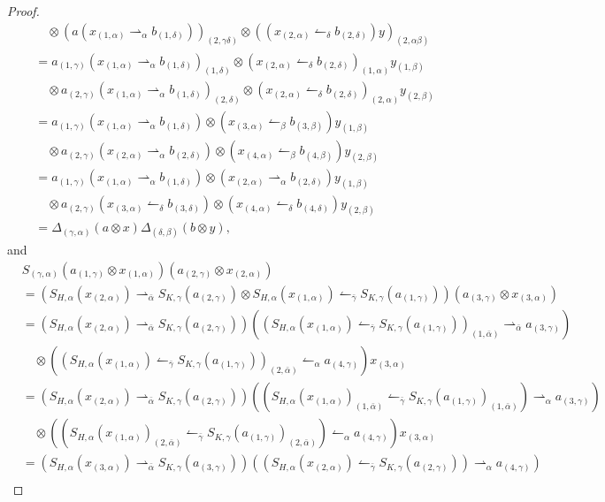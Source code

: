 \documentclass[11pt]{article}
\def\a{\alpha}
\def\b{\beta}
\def\d{\delta}
\def\g{\gamma}
\def\o{\otimes}
\begin{document}
\begin{proof}
\begin{align*}
&\quad \o(a(x_{(1,\a)}\rightharpoonup_\a b_{(1,\d)}))_{(2,\g\d)}\o((x_{(2,\a)}\leftharpoonup_\d b_{(2,\d)})y)_{(2,\a\b)}\\
&=a_{(1,\g)}(x_{(1,\a)}\rightharpoonup_\a b_{(1,\d)})_{(1,\d)}\o(x_{(2,\a)}\leftharpoonup_\d b_{(2,\d)})_{(1,\a)}y_{(1,\b)}\\
&\quad \o a_{(2,\g)}(x_{(1,\a)}\rightharpoonup_\a b_{(1,\d)})_{(2,\d)}\o(x_{(2,\a)}\leftharpoonup_\d b_{(2,\d)})_{(2,\a)}y_{(2,\b)}\\
&=a_{(1,\g)}(x_{(1,\a)}\rightharpoonup_\a b_{(1,\d)})\o(x_{(3,\a)}\leftharpoonup_\b b_{(3,\b)})y_{(1,\b)}\\
&\quad \o a_{(2,\g)}(x_{(2,\a)}\rightharpoonup_\a b_{(2,\d)})\o(x_{(4,\a)}\leftharpoonup_\b b_{(4,\b)})y_{(2,\b)}\\
&=a_{(1,\g)}(x_{(1,\a)}\rightharpoonup_\a b_{(1,\d)})\o (x_{(2,\a)}\rightharpoonup_\a b_{(2,\d)})y_{(1,\b)}\\
&\quad \o a_{(2,\g)}(x_{(3,\a)}\leftharpoonup_\d b_{(3,\d)})\o(x_{(4,\a)}\leftharpoonup_\d b_{(4,\d)})y_{(2,\b)}\\
&=\Delta_{(\g,\a)}(a\o x)\Delta_{(\d,\b)}(b\o y),
\end{align*}
and
\begin{align*}
&S_{(\g,\a)}(a_{(1,\g)}\o x_{(1,\a)})(a_{(2,\g)}\o x_{(2,\a)})\\
&=(S_{H,\a}(x_{(2,\a)})\rightharpoonup_{\bar{\a}}S_{K,\g}(a_{(2,\g)})\o S_{H,\a}(x_{(1,\a)})\leftharpoonup_{\bar{\g}}S_{K,\g}(a_{(1,\g)}))(a_{(3,\g)}\o x_{(3,\a)})\\
&=(S_{H,\a}(x_{(2,\a)})\rightharpoonup_{\bar{\a}}S_{K,\g}(a_{(2,\g)}))((S_{H,\a}(x_{(1,\a)})\leftharpoonup_{\bar{\g}}S_{K,\g}(a_{(1,\g)}))_{(1,\bar{\a})}\rightharpoonup_{\bar{\a}} a_{(3,\g)})\\
&\quad\o((S_{H,\a}(x_{(1,\a)})\leftharpoonup_{\bar{\g}}S_{K,\g}(a_{(1,\g)}))_{(2,\bar{\a})}\leftharpoonup_{\a} a_{(4,\g)})x_{(3,\a)}\\
&=(S_{H,\a}(x_{(2,\a)})\rightharpoonup_{\bar{\a}}S_{K,\g}(a_{(2,\g)}))((S_{H,\a}(x_{(1,\a)})_{(1,\bar{\a})}\leftharpoonup_{\bar{\g}}S_{K,\g}(a_{(1,\g)})_{(1,\bar{\a})})\rightharpoonup_{\a} a_{(3,\g)})\\
&\quad\o((S_{H,\a}(x_{(1,\a)})_{(2,\bar{\a})}\leftharpoonup_{\bar{\g}}S_{K,\g}(a_{(1,\g)})_{(2,\bar{\a})})\leftharpoonup_{\a} a_{(4,\g)})x_{(3,\a)}\\
&=(S_{H,\a}(x_{(3,\a)})\rightharpoonup_{\bar{\a}}S_{K,\g}(a_{(3,\g)}))((S_{H,\a}(x_{(2,\a)})\leftharpoonup_{\bar{\g}}S_{K,\g}(a_{(2,\g)}))\rightharpoonup_{\a} a_{(4,\g)})\\

\end{align*}
\end{proof}
\end{document}

